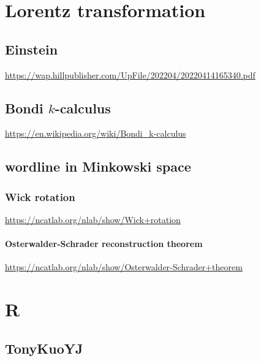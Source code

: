 \documentclass[
]{book}
\theoremstyle{definition}
\theoremstyle{definition}
\theoremstyle{definition}
\theoremstyle{definition}
\theoremstyle{remark}
\begin{document}
\hypertarget{lorentz-transformation}{%
\chapter{Lorentz transformation}\label{lorentz-transformation}}

\hypertarget{einstein}{%
\section{Einstein}\label{einstein}}

\url{https://wap.hillpublisher.com/UpFile/202204/20220414165340.pdf}

\hypertarget{bondi-k-calculus}{%
\section{\texorpdfstring{Bondi \(k\)-calculus}{Bondi k-calculus}}\label{bondi-k-calculus}}

\url{https://en.wikipedia.org/wiki/Bondi_k-calculus}

\hypertarget{wordline-in-minkowski-space}{%
\section{wordline in Minkowski space}\label{wordline-in-minkowski-space}}

\hypertarget{wick-rotation}{%
\subsection{Wick rotation}\label{wick-rotation}}

\url{https://ncatlab.org/nlab/show/Wick+rotation}

\hypertarget{osterwalder-schrader-reconstruction-theorem}{%
\subsubsection{Osterwalder-Schrader reconstruction theorem}\label{osterwalder-schrader-reconstruction-theorem}}

\url{https://ncatlab.org/nlab/show/Osterwalder-Schrader+theorem}

\hypertarget{r}{%
\chapter{R}\label{r}}

\hypertarget{tonykuoyj}{%
\section{TonyKuoYJ}\label{tonykuoyj}}
\end{document}
